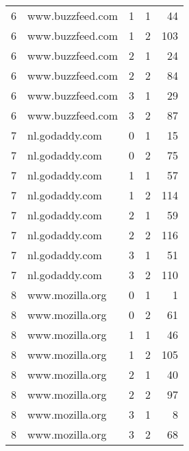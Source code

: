 \begin{tabular}{rllrr}
  6 &     www.buzzfeed.com &                  1 &       1 &               44 \\
  6 &     www.buzzfeed.com &                  1 &       2 &              103 \\
  6 &     www.buzzfeed.com &                  2 &       1 &               24 \\
  6 &     www.buzzfeed.com &                  2 &       2 &               84 \\
  6 &     www.buzzfeed.com &                  3 &       1 &               29 \\
  6 &     www.buzzfeed.com &                  3 &       2 &               87 \\
  7 &       nl.godaddy.com &                  0 &       1 &               15 \\
  7 &       nl.godaddy.com &                  0 &       2 &               75 \\
  7 &       nl.godaddy.com &                  1 &       1 &               57 \\
  7 &       nl.godaddy.com &                  1 &       2 &              114 \\
  7 &       nl.godaddy.com &                  2 &       1 &               59 \\
  7 &       nl.godaddy.com &                  2 &       2 &              116 \\
  7 &       nl.godaddy.com &                  3 &       1 &               51 \\
  7 &       nl.godaddy.com &                  3 &       2 &              110 \\
  8 &      www.mozilla.org &                  0 &       1 &                1 \\
  8 &      www.mozilla.org &                  0 &       2 &               61 \\
  8 &      www.mozilla.org &                  1 &       1 &               46 \\
  8 &      www.mozilla.org &                  1 &       2 &              105 \\
  8 &      www.mozilla.org &                  2 &       1 &               40 \\
  8 &      www.mozilla.org &                  2 &       2 &               97 \\
  8 &      www.mozilla.org &                  3 &       1 &                8 \\
  8 &      www.mozilla.org &                  3 &       2 &               68 \\

\end{tabular}
